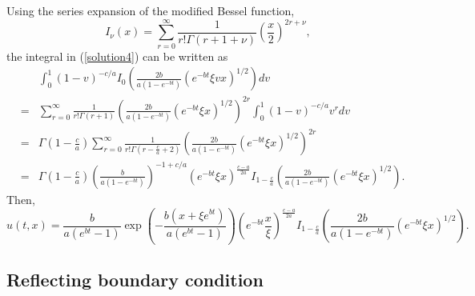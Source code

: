 \documentclass[12pt]{article}
\begin{document}
    Using the series expansion of the modified Bessel function,
    \begin{equation}
      \label{modified}
      I_{\nu}(x) = \sum_{r=0}^{\infty}\frac{1}{r!\Gamma(r+1+\nu)}\left(\frac{x}{2}\right)^{2r+\nu},
    \end{equation}
    the integral in (\ref{solution4}) can be written as
    \begin{eqnarray}
       && \int_0^1(1-v)^{-c/a}I_0\left(\frac{2b}{a(1-e^{-bt})}\left(e^{-bt}\xi v x\right)^{1/2}\right)dv \nonumber\\
      &=& \sum_{r=0}^{\infty}\frac{1}{r!\Gamma(r+1)}\left(\frac{2b}{a(1-e^{-bt})}\left(e^{-bt}\xi x\right)^{1/2}\right)^{2r}\int_0^1(1-v)^{-c/a}v^rdv \nonumber\\
      &=& \Gamma\left(1-\frac{c}{a}\right)\sum_{r=0}^{\infty}\frac{1}{\displaystyle r!\Gamma\left(r-\frac{c}{a}+2\right)}
              \left(\frac{2b}{a(1-e^{-bt})}\left(e^{-bt}\xi x\right)^{1/2}\right)^{2r} \nonumber\\
      &=& \Gamma\left(1-\frac{c}{a}\right)\left(\frac{b}{a(1-e^{-bt})}\right)^{-1+c/a}\left(e^{-bt}\xi x\right)^{\frac{c-a}{2a}}I_{1-\frac{c}{a}}
              \left(\frac{2b}{a(1-e^{-bt})}\left(e^{-bt}\xi x\right)^{1/2}\right).
    \end{eqnarray}
    Then,
    \begin{equation}
      u(t,x) = \frac{b}{a(e^{bt}-1)}\exp\left(-\frac{b(x+\xi e^{bt})}{a(e^{bt}-1)}\right)
                \left(e^{-bt}\frac{x}{\xi}\right)^{\frac{c-a}{2a}}I_{1-\frac{c}{a}}\left(\frac{2b}{a(1-e^{-bt})}\left(e^{-bt}\xi x\right)^{1/2}\right).
    \end{equation}

  \subsection{Reflecting boundary condition}
\end{document}
